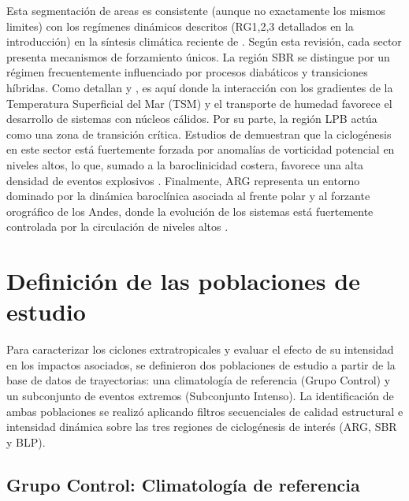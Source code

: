 Esta segmentación de areas es consistente (aunque no exactamente los mismos limites) con los regímenes dinámicos descritos (RG1,2,3 detallados en la introducción) en la síntesis climática reciente de \citet{reboita2026meteorology}. Según esta revisión, cada sector presenta mecanismos de forzamiento únicos. La región SBR se distingue por un régimen frecuentemente influenciado por procesos diabáticos y transiciones híbridas. Como detallan \citet{marrafon2022classificacao} y \citet{reboita2022from}, es aquí donde la interacción con los gradientes de la Temperatura Superficial del Mar (TSM) y el transporte de humedad favorece el desarrollo de sistemas con núcleos cálidos. Por su parte, la región LPB actúa como una zona de transición crítica. Estudios de \citet{crespo2020potential} demuestran que la ciclogénesis en este sector está fuertemente forzada por anomalías de vorticidad potencial en niveles altos, lo que, sumado a la baroclinicidad costera, favorece una alta densidad de eventos explosivos \citep{andrade2024composite}. Finalmente, ARG representa un entorno dominado por la dinámica baroclínica asociada al frente polar y al forzante orográfico de los Andes, donde la evolución de los sistemas está fuertemente controlada por la circulación de niveles altos \citep{vera2002cold, inatsu2004zonal}.


\section{Definición de las poblaciones de estudio}\label{sec:poblaciones_estudio}

Para caracterizar los ciclones extratropicales y evaluar el efecto de su intensidad en los impactos asociados, se definieron dos poblaciones de estudio a partir de la base de datos de trayectorias: una climatología de referencia (Grupo Control) y un subconjunto de eventos extremos (Subconjunto Intenso). La identificación de ambas poblaciones se realizó aplicando filtros secuenciales de calidad estructural e intensidad dinámica sobre las tres regiones de ciclogénesis de interés (ARG, SBR y BLP).

\subsection{Grupo Control: Climatología de referencia}\label{subsec:grupo_control}

